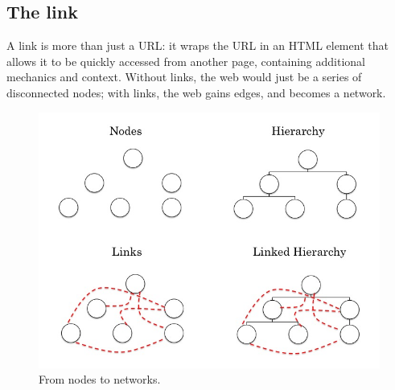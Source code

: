 
\subsection{The link}

A link is more than just a URL: it wraps the URL in an HTML element that allows it to be quickly accessed from another page, containing additional mechanics and context. Without links, the web would just be a series of disconnected nodes; with links, the web gains edges, and becomes a network.

\begin{figure}[ht]
\centering
\includegraphics[width=400pt]{figures/linkedhierarchy}
\caption{From nodes to networks.}
\label{fig:linkedhierarchy}
\end{figure}


